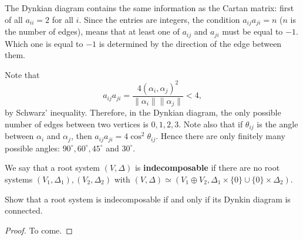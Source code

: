 \documentclass[11pt, english]{article}
\begin{document}
The Dynkian diagram contains the same information as the Cartan matrix: first of all $a_{ii}=2$ for all $i$. Since the entries are integers, the condition $a_{ij}a_{ji}=n$ ($n$ is the number of edges), means that at least one of $a_{ij}$ and $a_{ji}$ must be equal to $-1$. Which one is equal to $-1$ is determined by the direction of the edge between them.

\begin{remark}
  Note that 
$$
a_{ij} a_{ji} = \frac{4 (\alpha_i,\alpha_j)^2}{\| \alpha_i \| \| \alpha_j \|} < 4,
$$
by Schwarz' inequality. Therefore, in the Dynkian diagram, the only possible number of edges between two vertices is $0,1,2,3$. Note also that if $\theta_{ij}$ is the angle between $\alpha_i$ and $\alpha_j$, then $a_{ij}a_{ji}=4 \cos^2 \theta_{ij}$. Hence there are only finitely many possible angles: $90^\circ, 60^\circ, 45^\circ$ and $30^\circ$.
\end{remark}


We say that a root system $(V,\Delta)$ is \textbf{indecomposable} if there are no root systems $(V_1,\Delta_1), (V_2, \Delta_2)$ with $(V, \Delta) \simeq (V_1 \oplus V_2, \Delta_1 \times \{ 0\} \cup \{0 \} \times \Delta_2)$.

\begin{lemma}
 Show that a root system is indecomposable if and only if its Dynkin diagram is connected.
\end{lemma}
\begin{proof}
To come.
\end{proof}
\end{document}
